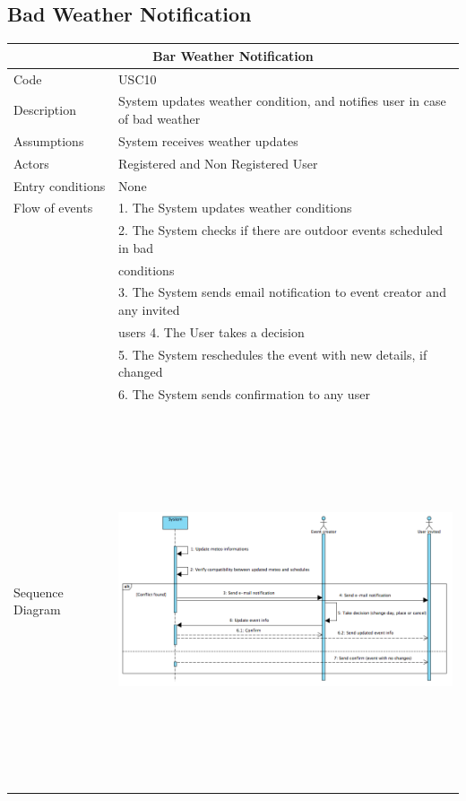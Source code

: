 \documentclass[12pt]{book}
\begin{document}
\subsection{Bad Weather Notification}
\vspace*{\fill}
\begin{center}
\begin{tabular}{ |l|l| }
  		\hline
  		\hline
  		\multicolumn{2}{|c|}{\large{\textbf{Bar Weather Notification}}} \\
  		\hline
  		\hline
  		Code  & USC10\\ 
		\hline
		Description & System updates weather condition, and notifies user in case of bad weather\\
		\hline
		Assumptions & System receives weather updates\\
		\hline
		Actors & Registered and Non Registered User\\
		\hline
		Entry conditions & None \\
		\hline
		Flow of events &  
			1. The System updates weather conditions\\&	
			2. The System checks if there are outdoor events scheduled in bad\\& conditions\\&
			3. The System sends email notification to event creator and any invited \\& users
			4. The User takes a decision\\&
			5. The System reschedules the event with new details, if changed \\ &
			6. The System sends confirmation to any user\\
  		\hline 
		&\\
		Sequence Diagram & \includegraphics[width=13cm,height=11cm]{badWeatherSD}  \\
		\hline
  		\hline
\end{tabular} \\
\end{center}
\vspace*{\fill}
\end{document}
